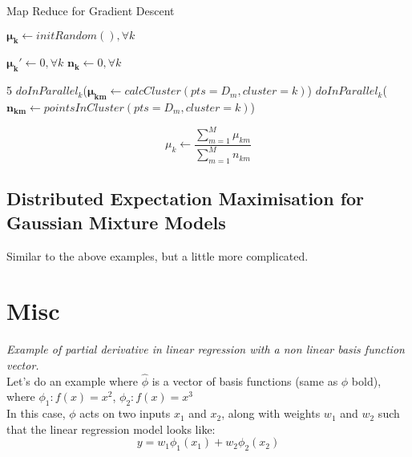 \documentclass[a4paper]{article}
\begin{document}
	\begin{algorithm}
		\caption{Map Reduce for Gradient Descent}
		\begin{algorithmic}[6]
			  
			
			\State $\mathbf{\mu_k} \gets initRandom(), \forall k$ 
			
			
			\State $\mathbf{\mu_k'} \gets 0, \forall k$ 
			\State $\mathbf{n_k} \gets 0, \forall k$ 
			
			5
			\State $doInParallel_k$($\mathbf{\mu_{km}} \gets calcCluster(pts=D_m,cluster=k)$)
			\State $doInParallel_k$($\mathbf{n_{km}} \gets pointsInCluster(pts=D_m,cluster=k)$)
			
			
			\State $$\mu_k \gets \frac{\sum_{m=1}^{M} \mu_{km}}{\sum_{m=1}^{M}n_{km}}$$
			
			\EndWhile
			
			\EndProcedure
		\end{algorithmic}
	\end{algorithm}
	
	\subsection{Distributed Expectation Maximisation for Gaussian Mixture Models}
	
	Similar to the above examples, but a little more complicated.
	
	\section{Misc} 
	
    \textit{Example of partial derivative in linear regression with a non linear basis function vector.} \\
    
	Let's do an example where $\hat{\phi}$ is a vector of basis functions (same as $\phi$ bold), where $\phi_1: f(x) = x^2$, $\phi_2: f(x) = x^3$ \\
	
	In this case, $\phi$ acts on two inputs $x_1$ and $x_2$, along with weights $w_1$ and $w_2$ such that the linear regression model looks like: 
	$$y = w_1\phi_1(x_1) + w_2\phi_2(x_2)$$
	
\end{document}
